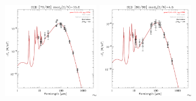 \documentclass[preprint2,longabstract]{aastex}
\begin{document}
\begin{figure}
    \includegraphics[trim=0 2mm 0 0, clip, width=40mm]{../SEDs/sed_79.pdf}
	\includegraphics[trim=0 2mm 0 0, clip, width=40mm]{../SEDs/sed_80.pdf}
\end{figure}
\end{document}
